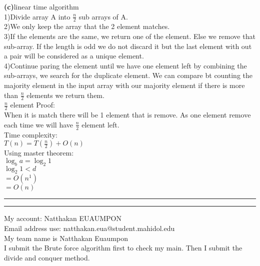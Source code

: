\documentclass[a4paper, 11pt]{article}
\newcommand{\question}[2] {\vspace{.25in} \hrule\vspace{0.5em}
\noindent{\bf #1: #2} \vspace{0.5em}
\hrule \vspace{.10in}}
\renewcommand{\part}[1] {\vspace{.10in} {\bf (#1)}}
\begin{document}
\part{c}{linear time algorithm}\\
1)Divide array A into $\frac{n}{2}$ sub arrays of A.\\
2)We only keep the array that the 2 element matches.\\
3)If the elements are the same, we return one of the element. Else we remove that sub-array. If the length is odd we do not discard it but the last element with out a pair will be considered as a unique element.\\
4)Continue paring the element until we have one element left by combining the sub-arrays, we search for the duplicate element. We can compare bt counting the majority element in the input array with our majority element if there is more than $\frac{n}{2}$ elements we return them.\\
$\frac{n}{2}$ element Proof:\\
When it is match there will be 1 element that is remove. As one element remove each time we will have $\frac{n}{2}$ element left.\\
Time complexity:\\
$T(n) = T(\frac{n}{2}) + O(n)$\\
Using master theorem:\\
$\log_{b} a = \log_{2} 1$\\
$\log_{2} 1 < d$\\
$= O(n^{1})$\\
$= O(n)$
\question{5}{Problem 5}
My account: Natthakan EUAUMPON\\
Email address use: natthakan.eua@student.mahidol.edu\\
My team name is Natthakan Euaumpon\\
I submit the Brute force algorithm first to check my main. Then I submit the divide and conquer method.
\end{document}
